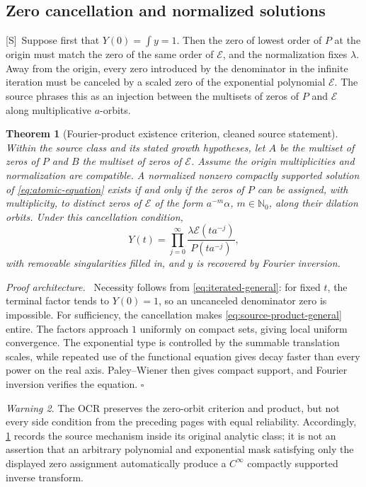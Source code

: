 \documentclass[11pt,oneside]{article}
\newtheorem{theorem}{Theorem}[section]
\theoremstyle{definition}
\theoremstyle{remark}
\newtheorem{warning}[theorem]{Warning}
\newcommand{\N}{\mathbb N}
\newcommand{\Smark}{\textcolor{sourceblue}{\textsf{[S]}}}
\newenvironment{proofidea}{\par\smallskip\noindent\textit{Proof architecture.}\ }{\hfill$\square$\par\smallskip}
\begin{document}
\subsection{Zero cancellation and normalized solutions}

\Smark\ Suppose first that $Y(0)=\int y=1$.  Then the zero of lowest order of $P$ at the
origin must match the zero of the same order of $\mathcal E$, and the normalization fixes
$\lambda$.  Away from the origin, every zero introduced by the denominator in the infinite
iteration must be canceled by a scaled zero of the exponential polynomial $\mathcal E$.
The source phrases this as an injection between the multisets of zeros of $P$ and
$\mathcal E$ along multiplicative $a$-orbits.

\begin{theorem}[Fourier-product existence criterion, cleaned source statement]
\label{thm:source-existence}
Within the source class and its stated growth hypotheses, let $A$ be the multiset of zeros
of $P$ and $B$ the multiset of zeros of $\mathcal E$.  Assume the origin multiplicities and
normalization are compatible.  A normalized nonzero compactly supported solution of
\eqref{eq:atomic-equation} exists if and only if the zeros of
$P$ can be assigned, with multiplicity, to distinct zeros of $\mathcal E$ of the form
$a^{-m}\alpha$, $m\in\N_0$, along their dilation orbits.  Under this cancellation condition,
\begin{equation}
 Y(t)=\prod_{j=0}^{\infty}
       \frac{\lambda\mathcal E(ta^{-j})}{P(ta^{-j})},
 \tag{S3.8}
 \label{eq:source-product-general}
\end{equation}
with removable singularities filled in, and $y$ is recovered by Fourier inversion.
\end{theorem}

\begin{proofidea}
Necessity follows from \eqref{eq:iterated-general}: for fixed $t$, the terminal factor tends
to $Y(0)=1$, so an uncanceled denominator zero is impossible.  For sufficiency, the
cancellation makes \eqref{eq:source-product-general} entire.  The factors approach $1$
uniformly on compact sets, giving local uniform convergence.  The exponential type is
controlled by the summable translation scales, while repeated use of the functional equation
gives decay faster than every power on the real axis.  Paley--Wiener then gives compact
support, and Fourier inversion verifies the equation.
\end{proofidea}

\begin{warning}
The OCR preserves the zero-orbit criterion and product, but not every side condition from the
preceding pages with equal reliability.  Accordingly, \cref{thm:source-existence} records the
source mechanism inside its original analytic class; it is not an assertion that an arbitrary
polynomial and exponential mask satisfying only the displayed zero assignment automatically
produce a $C^\infty$ compactly supported inverse transform.
\end{warning}
\end{document}
